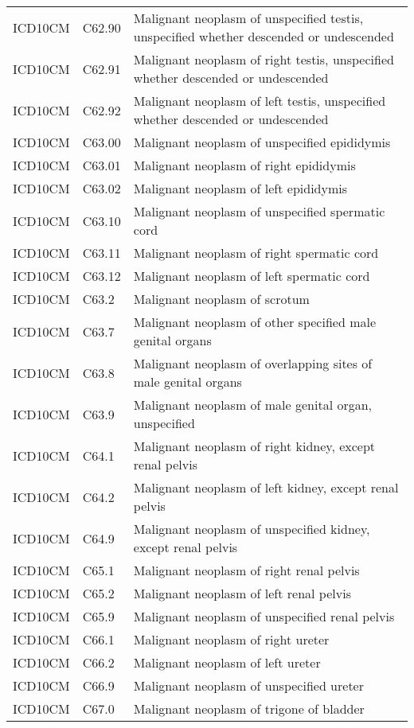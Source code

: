 \begin{longtable}{p{}p{}p{}}
  ICD10CM & C62.90 & Malignant neoplasm of unspecified testis, unspecified whether descended or undescended \\ 
  ICD10CM & C62.91 & Malignant neoplasm of right testis, unspecified whether descended or undescended \\ 
  ICD10CM & C62.92 & Malignant neoplasm of left testis, unspecified whether descended or undescended \\ 
  ICD10CM & C63.00 & Malignant neoplasm of unspecified epididymis \\ 
  ICD10CM & C63.01 & Malignant neoplasm of right epididymis \\ 
  ICD10CM & C63.02 & Malignant neoplasm of left epididymis \\ 
  ICD10CM & C63.10 & Malignant neoplasm of unspecified spermatic cord \\ 
  ICD10CM & C63.11 & Malignant neoplasm of right spermatic cord \\ 
  ICD10CM & C63.12 & Malignant neoplasm of left spermatic cord \\ 
  ICD10CM & C63.2 & Malignant neoplasm of scrotum \\ 
  ICD10CM & C63.7 & Malignant neoplasm of other specified male genital organs \\ 
  ICD10CM & C63.8 & Malignant neoplasm of overlapping sites of male genital organs \\ 
  ICD10CM & C63.9 & Malignant neoplasm of male genital organ, unspecified \\ 
  ICD10CM & C64.1 & Malignant neoplasm of right kidney, except renal pelvis \\ 
  ICD10CM & C64.2 & Malignant neoplasm of left kidney, except renal pelvis \\ 
  ICD10CM & C64.9 & Malignant neoplasm of unspecified kidney, except renal pelvis \\ 
  ICD10CM & C65.1 & Malignant neoplasm of right renal pelvis \\ 
  ICD10CM & C65.2 & Malignant neoplasm of left renal pelvis \\ 
  ICD10CM & C65.9 & Malignant neoplasm of unspecified renal pelvis \\ 
  ICD10CM & C66.1 & Malignant neoplasm of right ureter \\ 
  ICD10CM & C66.2 & Malignant neoplasm of left ureter \\ 
  ICD10CM & C66.9 & Malignant neoplasm of unspecified ureter \\ 
  ICD10CM & C67.0 & Malignant neoplasm of trigone of bladder \\ 

\end{longtable}
